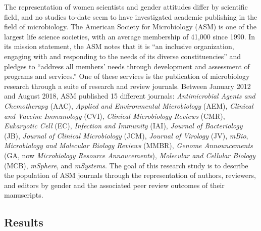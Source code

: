 \documentclass[11pt,]{article}
\begin{document}
The representation of women scientists and gender attitudes differ by
scientific field, and no studies to-date seem to have investigated
academic publishing in the field of microbiology. The American Society
for Microbiology (ASM) is one of the largest life science societies,
with an average membership of 41,000 since 1990. In its mission
statement, the ASM notes that it is ``an inclusive organization,
engaging with and responding to the needs of its diverse
constituencies'' and pledges to ``address all members' needs through
development and assessment of programs and services.'' One of these
services is the publication of microbiology research through a suite of
research and review journals. Between January 2012 and August 2018, ASM
published 15 different journals: \emph{Antimicrobial Agents and
Chemotherapy} (AAC), \emph{Applied and Environmental Microbiology}
(AEM), \emph{Clinical and Vaccine Immunology} (CVI), \emph{Clinical
Microbiology Reviews} (CMR), \emph{Eukaryotic Cell} (EC),
\emph{Infection and Immunity} (IAI), \emph{Journal of Bacteriology}
(JB), \emph{Journal of Clinical Microbiology} (JCM), \emph{Journal of
Virology} (JV), \emph{mBio}, \emph{Microbiology and Molecular Biology
Reviews} (MMBR), \emph{Genome Announcements} (GA, now \emph{Microbiology
Resource Annoucements}), \emph{Molecular and Cellular Biology} (MCB),
\emph{mSphere}, and \emph{mSystems}. The goal of this research study is
to describe the population of ASM journals through the representation of
authors, reviewers, and editors by gender and the associated peer review
outcomes of their manuscripts.

\subsection{Results}\label{results}
\end{document}

